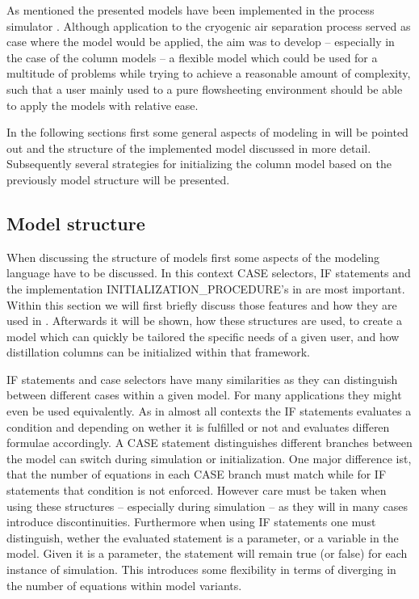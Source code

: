 ﻿As mentioned the presented models have been implemented in the process simulator \gproms. Although application
to the cryogenic air separation process served as case where the model would be applied, the aim was to develop
-- especially in the case of the column models -- a flexible model which could be used for a multitude of
problems while trying to achieve a reasonable amount of complexity, such that a user mainly used to a pure flowsheeting
environment should be able to apply the models with relative ease.

In the following sections first some general aspects of modeling in \gproms will be pointed out and the structure
of the implemented model discussed in more detail. Subsequently several strategies for initializing the column model
based on the previously model structure will be presented.

\subsection{Model structure}
\label{sec:mathpro:implementation:modelstructure}

    When discussing the structure of \gproms models first some aspects of the modeling language have to be discussed. 
    In this context CASE selectors, IF statements and the implementation INITIALIZATION\_PROCEDURE's in \gproms are most 
    important. Within this section we will first briefly discuss those features and how they are used in \gproms. 
    Afterwards it will be shown, how these structures are used, to create a model which can quickly be tailored the
    specific needs of a given user, and how distillation columns can be initialized within that framework. 
    
    IF statements and case selectors have many similarities as they can distinguish between different cases within a 
    given model. For many applications they might even be used equivalently. As in almost all contexts the IF statements 
    evaluates a condition and depending on wether it is fulfilled or not and evaluates differen formulae accordingly. 
    A  CASE statement distinguishes different branches between the model can switch during simulation or initialization. 
    One major difference ist, that the number of equations in each CASE branch must match while for IF statements that 
    condition is not enforced. However care must be taken when using these structures -- especially during simulation -- 
    as they will in many cases introduce discontinuities. Furthermore when using IF statements one must distinguish, 
    wether the evaluated statement is a parameter, or a variable in the model. Given it is a parameter, the statement will 
    remain true (or false) for each instance of simulation. This introduces some flexibility in terms of diverging 
    in the number of equations within model variants. 
    
